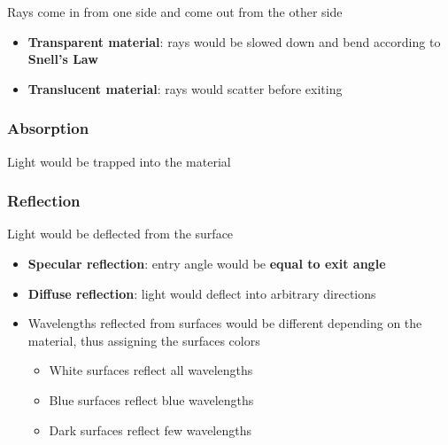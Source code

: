     Rays come in from one side and come out from the other side

    \begin{itemize}
      \item \textbf{Transparent material}: rays would be slowed down and bend
      according to \textbf{Snell's Law}
      \item \textbf{Translucent material}: rays would scatter before exiting
    \end{itemize}

  \subsubsection{Absorption}

    Light would be trapped into the material

  \subsubsection{Reflection}

    Light would be deflected from the surface

    \begin{itemize}
      \item \textbf{Specular reflection}: entry angle would be \textbf{equal to
      exit angle}
      \item \textbf{Diffuse reflection}: light would deflect into arbitrary
      directions
      \item Wavelengths reflected from surfaces would be different depending on
      the material, thus assigning the surfaces colors
      \begin{itemize}
        \item White surfaces reflect all wavelengths
        \item Blue surfaces reflect blue wavelengths
        \item Dark surfaces reflect few wavelengths
      \end{itemize}
    \end{itemize}
